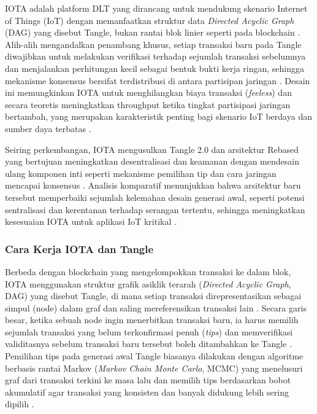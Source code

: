 IOTA adalah platform DLT yang dirancang untuk mendukung skenario Internet of Things (IoT) dengan memanfaatkan struktur data \emph{Directed Acyclic Graph} (DAG) yang disebut Tangle, bukan rantai blok linier seperti pada blockchain \parencite{Elevating_2025_iota_ehealth,FromTangleToRebased_2024}. 
Alih-alih mengandalkan penambang khusus, setiap transaksi baru pada Tangle diwajibkan untuk melakukan verifikasi terhadap sejumlah transaksi sebelumnya dan menjalankan perhitungan kecil sebagai bentuk bukti kerja ringan, sehingga mekanisme konsensus bersifat terdistribusi di antara partisipan jaringan \parencite{FromTangleToRebased_2024}. 
Desain ini memungkinkan IOTA untuk menghilangkan biaya transaksi (\emph{feeless}) dan secara teoretis meningkatkan throughput ketika tingkat partisipasi jaringan bertambah, yang merupakan karakteristik penting bagi skenario IoT berdaya dan sumber daya terbatas \parencite{Elevating_2025_iota_ehealth,FromTangleToRebased_2024}. 

Seiring perkembangan, IOTA mengusulkan Tangle 2.0 dan arsitektur Rebased yang bertujuan meningkatkan desentralisasi dan keamanan dengan mendesain ulang komponen inti seperti mekanisme pemilihan tip dan cara jaringan mencapai konsensus \parencite{FromTangleToRebased_2024}. 
Analisis komparatif menunjukkan bahwa arsitektur baru tersebut memperbaiki sejumlah kelemahan desain generasi awal, seperti potensi sentralisasi dan kerentanan terhadap serangan tertentu, sehingga meningkatkan kesesuaian IOTA untuk aplikasi IoT kritikal \parencite{FromTangleToRebased_2024}. 

\subsubsection{Cara Kerja IOTA dan Tangle}

Berbeda dengan blockchain yang mengelompokkan transaksi ke dalam blok, IOTA menggunakan struktur grafik asiklik terarah (\emph{Directed Acyclic Graph}, DAG) yang disebut Tangle, di mana setiap transaksi direpresentasikan sebagai simpul (node) dalam graf dan saling mereferensikan transaksi lain \parencite{TheTangle_Popov_2017,FromTangleToRebased_2024}. 
Secara garis besar, ketika sebuah node ingin menerbitkan transaksi baru, ia harus memilih sejumlah transaksi yang belum terkonfirmasi penuh (\emph{tips}) dan memverifikasi validitasnya sebelum transaksi baru tersebut boleh ditambahkan ke Tangle \parencite{TheTangle_Popov_2017}. 
Pemilihan tips pada generasi awal Tangle biasanya dilakukan dengan algoritme berbasis rantai Markov (\emph{Markov Chain Monte Carlo}, MCMC) yang menelusuri graf dari transaksi terkini ke masa lalu dan memilih tips berdasarkan bobot akumulatif agar transaksi yang konsisten dan banyak didukung lebih sering dipilih \parencite{TheTangle_Popov_2017}. 

